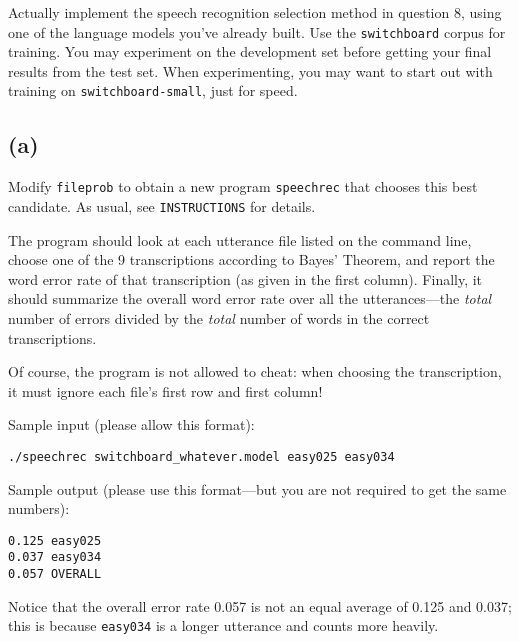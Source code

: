 \documentclass[12pt]{article}
\theoremstyle{plain}
\theoremstyle{definition}
\theoremstyle{remark}
\begin{document}
Actually implement the speech recognition selection method in question 8, using one of the language models you’ve already built. Use the \texttt{switchboard} corpus for training. You may experiment on the development set before getting your final results from the test set. When experimenting, you may want to start out with training on \texttt{switchboard-small}, just for speed.

\subsection*{(a)}
Modify \texttt{fileprob} to obtain a new program \texttt{speechrec} that chooses this best candidate. As usual, see \texttt{INSTRUCTIONS} for details.

The program should look at each utterance file listed on the command line, choose one of the 9 transcriptions according to Bayes’ Theorem, and report the word error rate of that transcription (as given in the first column). Finally, it should summarize the overall word error rate over all the utterances—the \textit{total} number of errors divided by the \textit{total} number of words in the correct transcriptions.

Of course, the program is not allowed to cheat: when choosing the transcription, it must ignore each file’s first row and first column!

Sample input (please allow this format):

\begin{verbatim}
./speechrec switchboard_whatever.model easy025 easy034
\end{verbatim}

Sample output (please use this format—but you are not required to get the same numbers):

\begin{verbatim}
0.125 easy025
0.037 easy034
0.057 OVERALL
\end{verbatim}

Notice that the overall error rate 0.057 is not an equal average of 0.125 and 0.037; this is because \texttt{easy034} is a longer utterance and counts more heavily.
\end{document}
